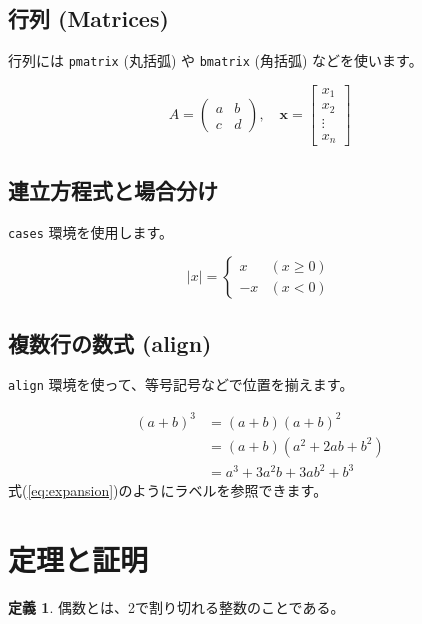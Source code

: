 \documentclass{ltjsarticle}
\theoremstyle{definition}
\newtheorem{definition}[theorem]{定義}
\begin{document}
\subsection{行列 (Matrices)}
行列には \texttt{pmatrix} (丸括弧) や \texttt{bmatrix} (角括弧) などを使います。

\begin{equation}
  A = \begin{pmatrix}
    a & b \\
    c & d
  \end{pmatrix}, \quad
  \bm{x} = \begin{bmatrix}
    x_1 \\
    x_2 \\
    \vdots \\
    x_n
  \end{bmatrix}
\end{equation}

\subsection{連立方程式と場合分け}
\texttt{cases} 環境を使用します。

\begin{equation}
  |x| = \begin{cases}
    x & (x \ge 0) \\
    -x & (x < 0)
  \end{cases}
\end{equation}

\subsection{複数行の数式 (align)}
\texttt{align} 環境を使って、等号記号などで位置を揃えます。

\begin{align}
  (a+b)^3 &= (a+b)(a+b)^2 \\
          &= (a+b)(a^2 + 2ab + b^2) \\
          &= a^3 + 3a^2b + 3ab^2 + b^3 \label{eq:expansion}
\end{align}
式(\ref{eq:expansion})のようにラベルを参照できます。

\section{定理と証明}
\begin{definition}
  偶数とは、2で割り切れる整数のことである。
\end{definition}
\end{document}
